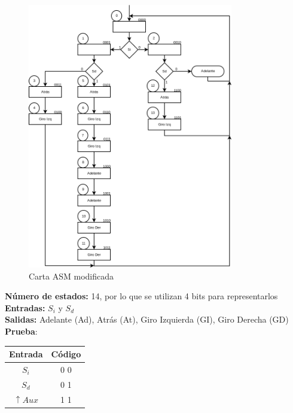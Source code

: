 \documentclass[12pt]{article}
\begin{document}
\begin{figure}[H]
	\centering
	\includegraphics[width=0.8\textwidth]{carta_asm}
	\caption{Carta ASM modificada}
\end{figure}

\medskip
\noindent \textbf{N\'umero de estados:} 14, por lo que se utilizan 4 bits para representarlos\\
\textbf{Entradas:} $S_{i}$ y $S_{d}$\\
\textbf{Salidas:} Adelante (Ad), Atr\'as (At), Giro Izquierda (GI), Giro Derecha (GD)\\
\textbf{Prueba}:\\

\begin{center}
	\begin{tabular}{|c|c|}
		\hline
		 Entrada & C\'odigo\\
		\hline 
		$S_{i}$ & 0 0 \\ 
		\hline 
		$S_{d}$ & 0 1 \\ 
		\hline 
		$\uparrow Aux$ & 1 1 \\ 
		\hline 
	\end{tabular}\\
\end{center}
\end{document}
